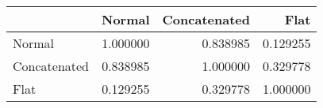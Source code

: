 \begin{tabular}{lrrr}
\toprule
{} &    Normal &  Concatenated &      Flat \\
\midrule
Normal       &  1.000000 &      0.838985 &  0.129255 \\
Concatenated &  0.838985 &      1.000000 &  0.329778 \\
Flat         &  0.129255 &      0.329778 &  1.000000 \\
\bottomrule
\end{tabular}
